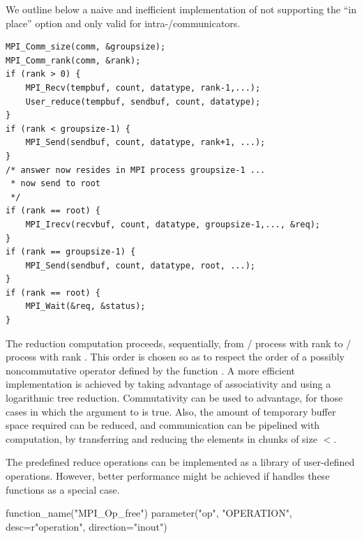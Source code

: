 \begin{implementors}
We outline below a naive and inefficient implementation of 
not
supporting the ``in place'' option and only valid for intra\hyphen/communicators.

\begin{lstlisting}[language={[MPI]C}]
MPI_Comm_size(comm, &groupsize);
MPI_Comm_rank(comm, &rank);
if (rank > 0) {
    MPI_Recv(tempbuf, count, datatype, rank-1,...);
    User_reduce(tempbuf, sendbuf, count, datatype);
}
if (rank < groupsize-1) {
    MPI_Send(sendbuf, count, datatype, rank+1, ...);
}
/* answer now resides in MPI process groupsize-1 ...
 * now send to root
 */
if (rank == root) {
    MPI_Irecv(recvbuf, count, datatype, groupsize-1,..., &req);
}
if (rank == groupsize-1) {
    MPI_Send(sendbuf, count, datatype, root, ...);
}
if (rank == root) {
    MPI_Wait(&req, &status);
}
\end{lstlisting}

The reduction computation proceeds, sequentially, from \MPI/ process with rank 
to \MPI/ process with rank
\gb{}.
This order is chosen so as to respect
the order of a possibly noncommutative operator defined by the
function .
A more efficient implementation is achieved by taking advantage
of associativity and
using a logarithmic tree reduction.  Commutativity can be used
to advantage, for those cases in which the  argument
to  is true.  Also, the amount of temporary buffer
space required can be reduced, and communication can be pipelined with
computation, by transferring and reducing the elements in chunks of
size  $<$.

The predefined reduce operations can be implemented as a library of
user-defined operations.  However, better performance might be
achieved if  handles these functions as a special
case.
\end{implementors}

%
\begin{mpi-binding}
    function_name("MPI_Op_free")
    parameter("op", "OPERATION", desc=r"operation", direction="inout")
\end{mpi-binding}

